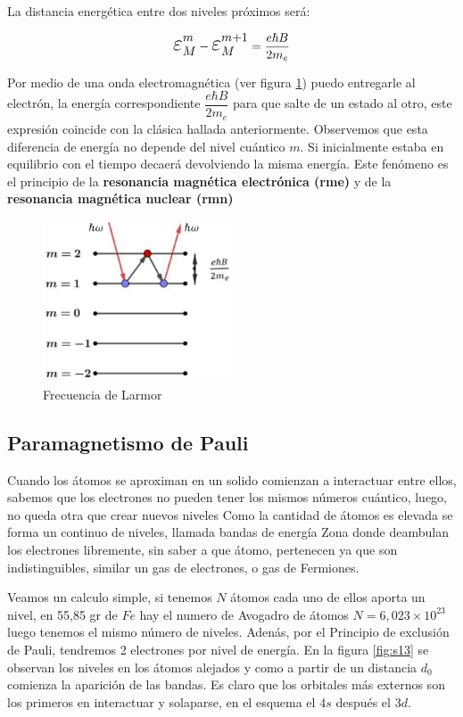 La distancia energética entre dos niveles próximos será:

\begin{equation}
	\Bb{\varepsilon}_{M}^{m}-\Bb{\varepsilon}_{M}^{m+1}=\dfrac{e\hbar B}{2m_{e}}
\end{equation}

Por medio de una onda electromagnética (ver figura \ref{fig:s12}) puedo entregarle al electrón, la energía correspondiente $\dfrac{e\hbar B}{2m_{e}}$ para que salte de un estado al otro, este expresión coincide con la clásica hallada anteriormente. Observemos que esta diferencia de energía no depende del nivel cuántico $m$. Si inicialmente estaba en equilibrio con el tiempo decaerá devolviendo la misma energía. Este fenómeno es el principio de la \textbf{resonancia magnética electrónica (rme)} y de la \textbf{resonancia magnética nuclear (rmn)}

\begin{figure}[H]
    \centering
    \includegraphics[width=0.5\textwidth]{./Figures/fig_s12}
	\caption{Frecuencia de Larmor}
	\label{fig:s12}
\end{figure}

\subsection{Paramagnetismo de Pauli}

Cuando los átomos se aproximan en un solido comienzan a interactuar entre ellos, sabemos que los electrones no pueden tener los mismos números cuántico, luego, no queda otra que crear nuevos niveles Como la cantidad de átomos es elevada se forma un continuo de niveles, llamada bandas de energía Zona donde deambulan los electrones libremente, sin saber a que átomo, pertenecen ya que son indistinguibles, similar un gas de electrones, o gas de Fermiones. 

Veamos un calculo simple, si tenemos $N$ átomos cada uno de ellos aporta un nivel, en 55,85 gr de $Fe$ hay el numero de Avogadro de átomos $N=6,023\times 10^{23}$ luego tenemos el mismo número de niveles. Adenás, por el Principio de exclusión de Pauli, tendremos 2 electrones por nivel de energía. En la figura \ref{fig:s13} se observan los niveles en los átomos alejados y
como a partir de un distancia $d_{0}$ comienza la aparición de las bandas. Es claro que los orbitales más externos son los primeros en interactuar y solaparse, en el esquema el $4s$
después el $3d$.

